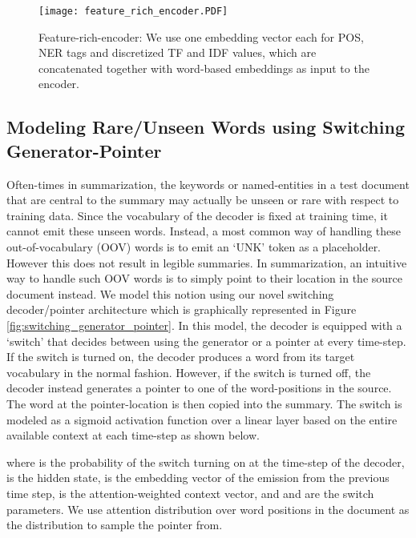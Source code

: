 \documentclass[11pt]{article}
\begin{document}
\begin{figure}[ht]
    \vspace{-0.3in}
	\centering
  \texttt{[image: feature\_rich\_encoder.PDF]}
  \vspace{-0.6in}
	\caption{{\small Feature-rich-encoder: We use one embedding vector each for POS, NER tags and discretized TF and IDF values, which are concatenated together with word-based embeddings as input to the encoder.}}
	\label{fig:feature_rich_encoder}
\end{figure}

\subsection{Modeling Rare/Unseen Words using Switching Generator-Pointer}\label{sec:switch}
Often-times in summarization, the keywords or named-entities in a test document that are central to the summary may actually be unseen or rare with respect to training data. Since the vocabulary of the decoder is fixed at training time, it cannot emit these unseen words. Instead, a most common way of handling these out-of-vocabulary (OOV) words is to emit  an `UNK' token as a placeholder. However this does not result in legible summaries. In summarization, an intuitive way to handle such OOV words is to simply point to their location in the source document instead. We model this notion using our novel switching decoder/pointer architecture which is graphically represented in Figure \ref{fig:switching_generator_pointer}. In this model, the decoder is equipped with a `switch' that decides between using the generator or a pointer at every time-step. If the switch is turned on, the decoder produces a word from its target vocabulary in the normal fashion. However, if the switch is turned off, the decoder instead generates a pointer to one of the word-positions in the source. The word at the pointer-location is then copied into the summary.  The switch is modeled as a sigmoid activation function over a linear layer based on the entire available context at each time-step as shown below.

where  is the probability of the switch turning on at the  time-step of the decoder,  is the hidden state,   is the embedding vector of the emission from the previous time step,  is the attention-weighted context vector, and  and  are the switch parameters. We use attention distribution over word positions in the document as the distribution to sample the pointer from.
\end{document}
